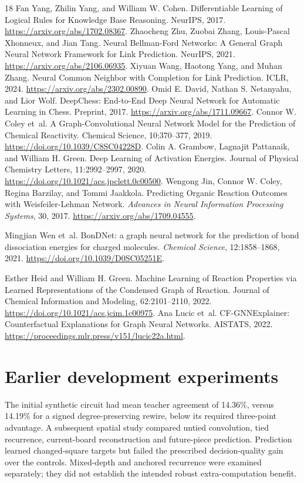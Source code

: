 \documentclass{article}
\begin{document}
\begin{thebibliography}{18}
Fan Yang, Zhilin Yang, and William W. Cohen. Differentiable Learning of Logical
Rules for Knowledge Base Reasoning. NeurIPS, 2017.
\url{https://arxiv.org/abs/1702.08367}.
Zhaocheng Zhu, Zuobai Zhang, Louis-Pascal Xhonneux, and Jian Tang.
Neural Bellman-Ford Networks: A General Graph Neural Network Framework for Link
Prediction. NeurIPS, 2021. \url{https://arxiv.org/abs/2106.06935}.
Xiyuan Wang, Haotong Yang, and Muhan Zhang. Neural Common Neighbor with Completion
for Link Prediction. ICLR, 2024. \url{https://arxiv.org/abs/2302.00890}.
Omid E. David, Nathan S. Netanyahu, and Lior Wolf. DeepChess: End-to-End Deep
Neural Network for Automatic Learning in Chess. Preprint, 2017.
\url{https://arxiv.org/abs/1711.09667}.
Connor W. Coley et~al. A Graph-Convolutional Neural Network Model for the
Prediction of Chemical Reactivity. Chemical Science, 10:370--377, 2019.
\url{https://doi.org/10.1039/C8SC04228D}.
Colin A. Grambow, Lagnajit Pattanaik, and William H. Green. Deep Learning of
Activation Energies. Journal of Physical Chemistry Letters, 11:2992--2997, 2020.
\url{https://doi.org/10.1021/acs.jpclett.0c00500}.
Wengong Jin, Connor W. Coley, Regina Barzilay, and Tommi Jaakkola.
Predicting Organic Reaction Outcomes with Weisfeiler-Lehman Network.
\emph{Advances in Neural Information Processing Systems}, 30, 2017.
\url{https://arxiv.org/abs/1709.04555}.

Mingjian Wen et~al. BonDNet: a graph neural network for the prediction of bond
dissociation energies for charged molecules. \emph{Chemical Science},
12:1858--1868, 2021. \url{https://doi.org/10.1039/D0SC05251E}.

Esther Heid and William H. Green. Machine Learning of Reaction Properties via
Learned Representations of the Condensed Graph of Reaction. Journal of Chemical
Information and Modeling, 62:2101--2110, 2022.
\url{https://doi.org/10.1021/acs.jcim.1c00975}.
Ana Lucic et~al. CF-GNNExplainer: Counterfactual Explanations for Graph Neural
Networks. AISTATS, 2022. \url{https://proceedings.mlr.press/v151/lucic22a.html}.
\end{thebibliography}
\endgroup

\appendix
\section{Earlier development experiments}
The initial synthetic circuit had mean teacher agreement of 14.36\%, versus
14.19\% for a signed degree-preserving rewire, below its required three-point
advantage. A subsequent spatial study compared untied convolution, tied
recurrence, current-board reconstruction and future-piece prediction. Prediction
learned changed-square targets but failed the prescribed decision-quality gain
over the controls. Mixed-depth and anchored recurrence were examined separately;
they did not establish the intended robust extra-computation benefit.
\end{document}
